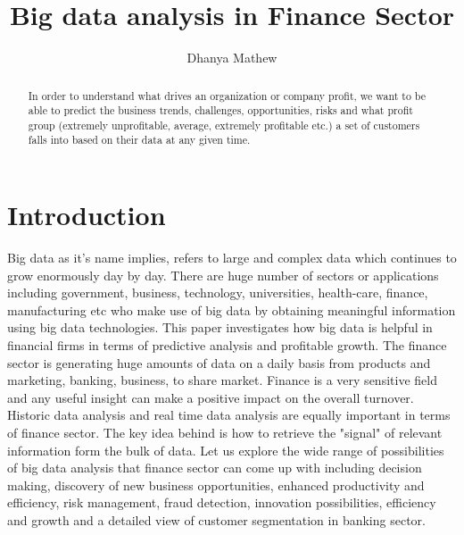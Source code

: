 \documentclass[sigconf]{acmart}
\begin{document}
\title{Big data analysis in Finance Sector}


\author{Dhanya Mathew}

\renewcommand{\shortauthors}{B. Trovato et al.}


\begin{abstract}

In order to understand what drives an organization or company profit, we want to be able to predict the business trends, challenges, opportunities, risks and what profit group (extremely unprofitable, average, extremely profitable etc.) a set of customers falls into based on their data at any given time.\cite{https://www-935.ibm.com}

\end{abstract}



\maketitle

\section{Introduction}

Big data as it's name implies, refers to large and complex data which continues to grow enormously day by day. There are huge number of sectors or applications including government, business, technology, universities, health-care, finance, manufacturing etc who make use of big data by obtaining meaningful information using big data technologies. This paper investigates how big data is helpful in financial firms in terms of predictive analysis and profitable growth. The finance sector is generating huge amounts of data on a daily basis from products and marketing, banking, business, to share market. Finance is a very sensitive field and any useful insight can make a positive impact on the overall turnover. Historic data analysis and real time data analysis are equally important in terms of finance sector. The key idea behind is how to retrieve the "signal" of relevant information form the bulk of data. Let us explore the wide range of possibilities of big data analysis that finance sector can come up with including decision making, discovery of new business opportunities, enhanced productivity and efficiency, risk management, fraud detection, innovation possibilities, efficiency and growth and a detailed view of customer segmentation in banking sector. \cite{}
\end{document}
